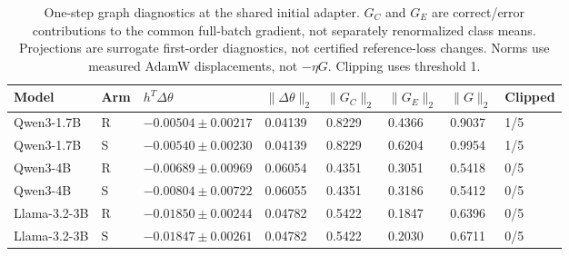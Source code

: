 \begin{table}[H]
\caption{One-step graph diagnostics at the shared initial adapter. $G_C$ and $G_E$ are correct/error contributions to the common full-batch gradient, not separately renormalized class means. Projections are surrogate first-order diagnostics, not certified reference-loss changes. Norms use measured AdamW displacements, not $-\eta G$. Clipping uses threshold 1.}
\label{tab:one-step-diagnostics}
\centering\small\setlength{\tabcolsep}{3pt}
\begin{tabular}{@{}llllllll@{}}
\toprule
Model & Arm & $h^T\Delta\theta$ & $\|\Delta\theta\|_2$ & $\|G_C\|_2$ & $\|G_E\|_2$ & $\|G\|_2$ & Clipped\\
\midrule
Qwen3-1.7B & R & $-0.00504\pm0.00217$ & 0.04139 & 0.8229 & 0.4366 & 0.9037 & 1/5\\
Qwen3-1.7B & S & $-0.00540\pm0.00230$ & 0.04139 & 0.8229 & 0.6204 & 0.9954 & 1/5\\
Qwen3-4B & R & $-0.00689\pm0.00969$ & 0.06054 & 0.4351 & 0.3051 & 0.5418 & 0/5\\
Qwen3-4B & S & $-0.00804\pm0.00722$ & 0.06055 & 0.4351 & 0.3186 & 0.5412 & 0/5\\
Llama-3.2-3B & R & $-0.01850\pm0.00244$ & 0.04782 & 0.5422 & 0.1847 & 0.6396 & 0/5\\
Llama-3.2-3B & S & $-0.01847\pm0.00261$ & 0.04782 & 0.5422 & 0.2030 & 0.6711 & 0/5\\
\bottomrule
\end{tabular}
\end{table}
